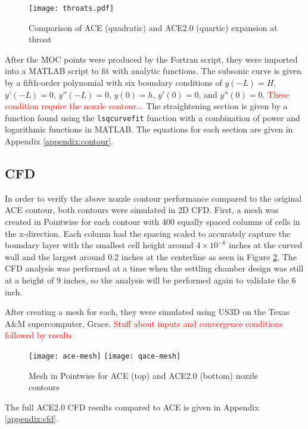 \begin{figure}[ht!]
    \centering
    \texttt{[image: throats.pdf]}
    \caption{Comparison of ACE (quadratic) and ACE2.0 (quartic) expansion at throat}
    \label{fig:throats}
\end{figure}

After the MOC points were produced by the Fortran script, they were imported into a MATLAB script to fit with analytic functions. The subsonic curve is given by a fifth-order polynomial with six boundary conditions of $y(-L)=H$, $y'(-L)=0$, $y''(-L)=0$, $y(0)=h$, $y'(0)=0$, and $y''(0)=0$. \textcolor{red}{These condition require the nozzle contour...} The straightening section is given by a function found using the \texttt{lsqcurvefit} function with a combination of power and logarithmic functions in MATLAB. The equations for each section are given in Appendix \ref{appendix:contour}.

\subsection{CFD}

In order to verify the above nozzle contour performance compared to the original ACE contour, both contours were simulated in 2D CFD. First, a mesh was created in Pointwise for each contour with 400 equally spaced columns of cells in the x-direction. Each column had the spacing scaled to accurately capture the boundary layer with the smallest cell height around $4 \times 10^{-6}$ inches at the curved wall and the largest around 0.2 inches at the centerline as seen in Figure \ref{fig:mesh}. The CFD analysis was performed at a time when the settling chamber design was still at a height of 9 inches, so the analysis will be performed again to validate the 6 inch.

After creating a mesh for each, they were simulated using US3D on the Texas A\&M supercomputer, Grace. \textcolor{red}{Stuff about inputs and convergence conditions followed by results}

\begin{figure}[ht!]
    \centering
    \texttt{[image: ace-mesh]}
    \texttt{[image: qace-mesh]}
    \caption{Mesh in Pointwise for ACE (top) and ACE2.0 (bottom) nozzle contours}
    \label{fig:mesh}
\end{figure}

The full ACE2.0 CFD results compared to ACE is given in Appendix \ref{appendix:cfd}.

